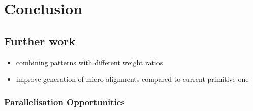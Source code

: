 \chapter{Conclusion}

\section{Further work}

\begin{itemize}
	\item combining patterns with different weight ratios
	\item improve generation of micro alignments compared to current primitive one
\end{itemize}

\subsection{Parallelisation Opportunities}
